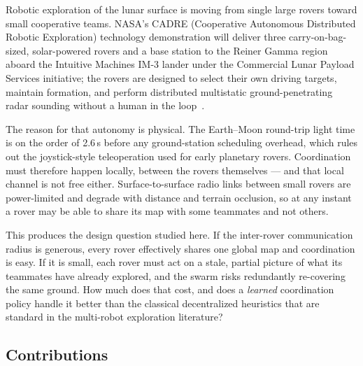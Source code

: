 \documentclass[11pt]{article}
\begin{document}
Robotic exploration of the lunar surface is moving from single large rovers
toward small cooperative teams. NASA's CADRE (Cooperative Autonomous
Distributed Robotic Exploration) technology demonstration will deliver three
carry-on-bag-sized, solar-powered rovers and a base station to the Reiner Gamma
region aboard the Intuitive Machines IM-3 lander under the Commercial Lunar
Payload Services initiative; the rovers are designed to select their own
driving targets, maintain formation, and perform distributed multistatic
ground-penetrating radar sounding without a human in the
loop~\cite{cadre_jpl,cadre_planning,cadre_exploration}.

The reason for that autonomy is physical. The Earth--Moon round-trip light time
is on the order of 2.6\,s before any ground-station scheduling overhead, which
rules out the joystick-style teleoperation used for early planetary rovers.
Coordination must therefore happen locally, between the rovers themselves --- and
that local channel is not free either. Surface-to-surface radio links between
small rovers are power-limited and degrade with distance and terrain occlusion,
so at any instant a rover may be able to share its map with some teammates and
not others.

This produces the design question studied here. If the inter-rover
communication radius is generous, every rover effectively shares one global map
and coordination is easy. If it is small, each rover must act on a stale,
partial picture of what its teammates have already explored, and the swarm risks
redundantly re-covering the same ground. How much does that cost, and does a
\emph{learned} coordination policy handle it better than the classical
decentralized heuristics that are standard in the multi-robot exploration
literature?

\subsection{Contributions}
\end{document}
